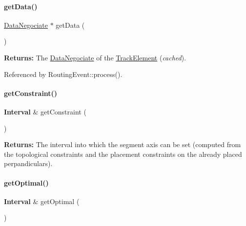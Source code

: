 \paragraph{\texorpdfstring{get\+Data()}{getData()}}
{\footnotesize\ttfamily \hyperlink{classKite_1_1DataNegociate}{Data\+Negociate} $\ast$ get\+Data (\begin{DoxyParamCaption}{ }\end{DoxyParamCaption})\hspace{0.3cm}{\ttfamily [inline]}}

{\bfseries Returns\+:} The \hyperlink{classKite_1_1DataNegociate}{Data\+Negociate} of the \hyperlink{classKite_1_1TrackElement}{Track\+Element} ({\itshape cached}). 

Referenced by Routing\+Event\+::process().

\mbox{\label{classKite_1_1SegmentFsm_abf6603c742bee65a4effa24135f2d955}} 
\paragraph{\texorpdfstring{get\+Constraint()}{getConstraint()}}
{\footnotesize\ttfamily \textbf{ Interval} \& get\+Constraint (\begin{DoxyParamCaption}{ }\end{DoxyParamCaption})\hspace{0.3cm}{\ttfamily [inline]}}

{\bfseries Returns\+:} The interval into which the segment axis can be set (computed from the topological constraints and the placement constraints on the already placed perpandiculars). \mbox{\label{classKite_1_1SegmentFsm_a9d1a7f4108b49d3096d8c733fabe60f3}} 
\paragraph{\texorpdfstring{get\+Optimal()}{getOptimal()}}
{\footnotesize\ttfamily \textbf{ Interval} \& get\+Optimal (\begin{DoxyParamCaption}{ }\end{DoxyParamCaption})\hspace{0.3cm}{\ttfamily [inline]}}

